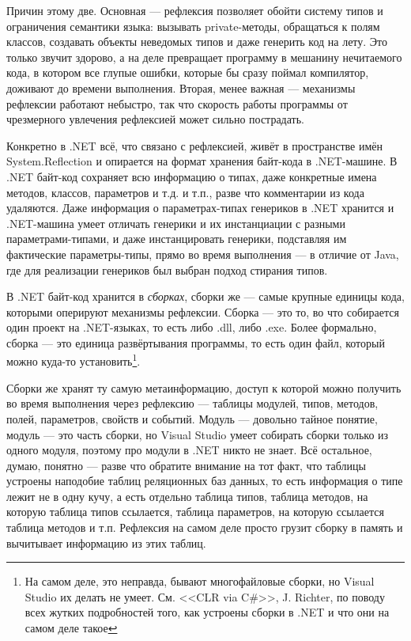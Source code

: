\documentclass[a5paper]{article}
\begin{document}
Причин этому две. Основная --- рефлексия позволяет обойти систему типов и ограничения семантики языка: вызывать private-методы, обращаться к полям классов, создавать объекты неведомых типов и даже генерить код на лету. Это только звучит здорово, а на деле превращает программу в мешанину нечитаемого кода, в котором все глупые ошибки, которые бы сразу поймал компилятор, доживают до времени выполнения. Вторая, менее важная --- механизмы рефлексии работают небыстро, так что скорость работы программы от чрезмерного увлечения рефлексией может сильно пострадать.

Конкретно в .NET всё, что связано с рефлексией, живёт в пространстве имён System.Reflection и опирается на формат хранения байт-кода в .NET-машине. В .NET байт-код сохраняет всю информацию о типах, даже конкретные имена методов, классов, параметров и т.д. и т.п., разве что комментарии из кода удаляются. Даже информация о параметрах-типах генериков в .NET хранится и .NET-машина умеет отличать генерики и их инстанциации с разными параметрами-типами, и даже инстанцировать генерики, подставляя им фактические параметры-типы, прямо во время выполнения --- в отличие от Java, где для реализации генериков был выбран подход стирания типов.

В .NET байт-код хранится в \textit{сборках}, сборки же --- самые крупные единицы кода, которыми оперируют механизмы рефлексии. Сборка --- это то, во что собирается один проект на .NET-языках, то есть либо .dll, либо .exe. Более формально, сборка --- это единица развёртывания программы, то есть один файл, который можно куда-то установить\footnote{На самом деле, это неправда, бывают многофайловые сборки, но Visual Studio их делать не умеет. См. <<CLR via C\#>>, J. Richter, по поводу всех жутких подробностей того, как устроены сборки в .NET и что они на самом деле такое}.

Сборки же хранят ту самую метаинформацию, доступ к которой можно получить во время выполнения через рефлексию --- таблицы модулей, типов, методов, полей, параметров, свойств и событий. Модуль --- довольно тайное понятие, модуль --- это часть сборки, но Visual Studio умеет собирать сборки только из одного модуля, поэтому про модули в .NET никто не знает. Всё остальное, думаю, понятно --- разве что обратите внимание на тот факт, что таблицы устроены наподобие таблиц реляционных баз данных, то есть информация о типе лежит не в одну кучу, а есть отдельно таблица типов, таблица методов, на которую таблица типов ссылается, таблица параметров, на которую ссылается таблица методов и т.п. Рефлексия на самом деле просто грузит сборку в память и вычитывает информацию из этих таблиц.
\end{document}
